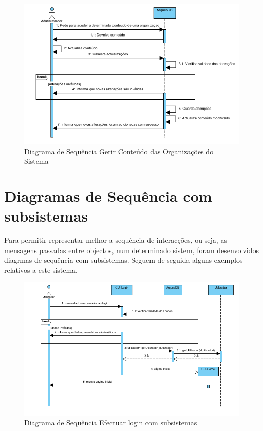 ﻿\documentclass[12pt,a4paper]{article}
\begin{document}
\begin{figure}[h!]
\centering
\includegraphics[scale=1]{sequencia/gerirconteudo}
\caption{Diagrama de Sequência Gerir Conteúdo das Organizações do Sistema} 
\end{figure}  

\clearpage
\section{Diagramas de Sequência com subsistemas}
Para permitir representar melhor a sequência de interacções, ou
seja, as mensagens passadas entre objectos, num determinado sistem, foram desenvolvidos diagrmas de sequência com subsistemas. Seguem de seguida alguns exemplos relativos a este sistema.\\

\begin{figure}[h!]
\centering
\includegraphics[scale=0.7]{sequencia/est_login}
\caption{Diagrama de Sequência Efectuar login com subsistemas} 
\end{figure}  
\end{document}
